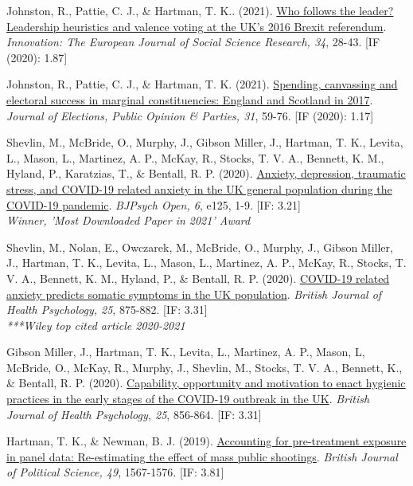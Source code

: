 \documentclass[12pt]{article}
\begin{document}
\begin{bibenum}
\item Johnston, R., Pattie, C. J., \& {Hartman, T. K.}. 
	(2021). 
	\href{https://doi.org/10.1080/13511610.2020.1746905}
	{Who follows the leader? Leadership heuristics 
	and valence voting at the UK’s 2016 Brexit referendum}. 
	\emph{Innovation: The European Journal of Social 
	Science Research, 34}, 28-43. [IF (2020): 1.87]

\item Johnston, R., Pattie, C. J., \& Hartman, T. K. 
	(2021). 
	\href{https://doi.org/10.1080/17457289.2019.1582534}
	{Spending, canvassing and electoral success in 
	marginal constituencies: England and Scotland 
	in 2017}. \emph{Journal of Elections, Public 
	Opinion \& Parties, 31}, 59-76. [IF (2020): 1.17]
		
\item Shevlin, M.,  McBride, O., Murphy, J., 
	Gibson Miller, J., Hartman, T. K., Levita, L., 
	Mason, L., Martinez, A. P., McKay, R., 
	Stocks, T. V. A., Bennett, K. M., Hyland, P., 
	Karatzias, T., \& Bentall, R. P. (2020). 
	\href{https://doi.org/10.1192/bjo.2020.109}
	{Anxiety, depression, traumatic stress, and COVID-19 
	related anxiety in the UK general population 
	during the COVID-19 pandemic}.
	\emph{BJPsych Open, 6}, e125, 1-9. [IF: 3.21]\\
	\textit{Winner, 'Most Downloaded Paper in 2021' Award}

\item Shevlin, M., Nolan, E., Owczarek, M., 
	McBride, O., Murphy, J., Gibson Miller, J., 
	Hartman, T. K., Levita, L., Mason, L., 
	Martinez, A. P., McKay, R., Stocks, T. V. A., 
	Bennett, K. M., Hyland, P., \& Bentall, R. P. (2020).
	\href{https://doi.org/10.1111/bjhp.12430}
	{COVID-19 related anxiety predicts somatic 
	symptoms in the UK population}.
	\emph{British Journal of Health Psychology, 25}, 
	875-882. [IF: 3.31]\\
	\textit{***Wiley top cited article 2020-2021}

\item Gibson Miller, J., Hartman, T. K., Levita, L., 
	Martinez, A. P., Mason, L, McBride, O., 
	McKay, R., Murphy, J., Shevlin, M., 
	Stocks, T. V. A., Bennett, K., \& Bentall, R. P. (2020).  
	\href{https://doi.org/10.1111/bjhp.12426}{Capability, 
	opportunity and motivation to enact hygienic 
	practices in the early stages of the COVID-19 
	outbreak in the UK}. 
	\emph{British Journal of Health Psychology, 25}, 
	856-864. [IF: 3.31]
		
\item Hartman, T. K., \& Newman, B. J. (2019). 
	\href{https://doi.org/10.1017/S0007123418000467}
	{Accounting for pre-treatment exposure in panel 
	data: Re-estimating the effect of mass 
	public shootings}. 
	\emph{British Journal of Political Science, 49}, 
	1567-1576. [IF: 3.81]


\end{bibenum}
\end{document}
